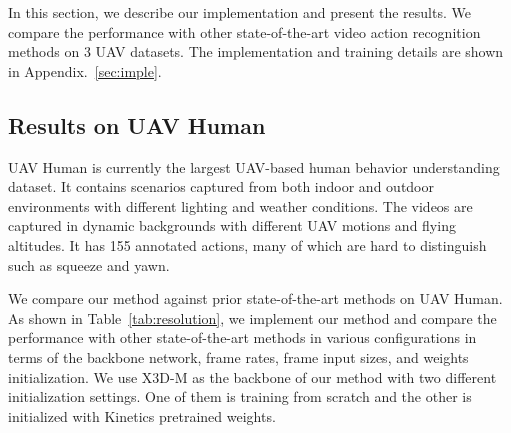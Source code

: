 \documentclass[10pt,twocolumn,letterpaper]{article}
\begin{document}
{ \begin{table}
\centering
{}
\vspace{-7pt}
\caption{Results on NEC Drones. Our method shows an improvement of 12.5\% on top-1 accuracy against the baseline X3D-M\cite{feichtenhofer2020x3d}, 7.2\% over current state-of-the-art FAR \cite{divya2022far}.}
\vspace{-7pt}
\label{tab:more_drones}
\end{table}
 
In this section, we describe our implementation and present the results. We compare the performance with other state-of-the-art video action recognition methods on 3 UAV datasets. The implementation and training details are shown in Appendix.~\ref{sec:imple}.









\subsection{Results on UAV Human}
UAV Human is currently the largest UAV-based human behavior understanding dataset. It contains scenarios captured from both indoor and outdoor environments with different lighting and weather conditions. The videos are captured in dynamic backgrounds with different UAV motions and flying altitudes. It has 155 annotated actions, many of which are hard to distinguish such as squeeze and yawn.

We compare our method against prior state-of-the-art methods on UAV Human. As shown in Table~\ref{tab:resolution}, we implement our method and compare the performance with other state-of-the-art methods in various configurations in terms of the backbone network, frame rates, frame input sizes, and weights initialization. We use X3D-M as the backbone of our method with two different initialization settings. One of them is training from scratch and the other is initialized with Kinetics pretrained weights. 

}
\end{document}
